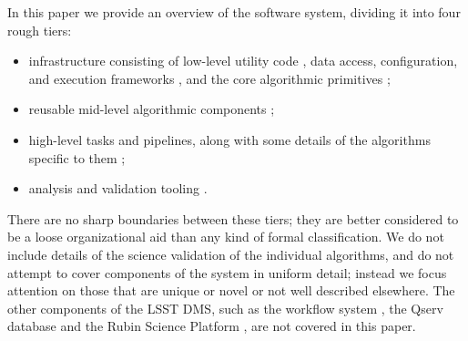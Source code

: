 In this paper we provide an overview of the software system, dividing it into four rough tiers:
\begin{itemize}
\item infrastructure consisting of low-level utility code , data access, configuration, and execution frameworks , and the core algorithmic primitives ;
\item reusable mid-level algorithmic components ;
\item high-level tasks and pipelines, along with some details of the algorithms specific to them ;
\item analysis and validation tooling .
\end{itemize}
There are no sharp boundaries between these tiers; they are better considered to be a loose organizational aid than any kind of formal classification.
We do not include details of the science validation of the individual algorithms, and do not attempt to cover components of the system in uniform detail; instead we focus attention on those that are unique or novel or not well described elsewhere.
The other components of the LSST DMS, such as the workflow system \citep{2025ASPC..538..325G,2024EPJWC.29504026K}, the Qserv database \citep{Wang:2011:QDS:2063348.2063364,2025ASPC..538..114M} and the Rubin Science Platform \citep{LSE-319,2024ASPC..535..227O}, are not covered in this paper.

